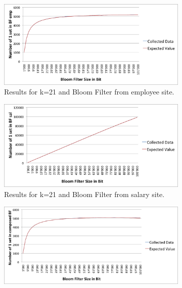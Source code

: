 \documentclass[12]{scrartcl}
\begin{document}
\begin{figure}[H]
	\begin{subfigure}[t]{\textwidth}
		\begin{center}
			\includegraphics[scale=0.3]{res/21-emp.png}
		\end{center}
		\caption{Results for k=21 and Bloom Filter from employee site.}
	\end{subfigure}
	\begin{subfigure}[t]{\textwidth}
		\begin{center}
			\includegraphics[scale=0.3]{res/21-sal.png}
		\end{center}
		\caption{Results for k=21 and Bloom Filter from salary site.}
	\end{subfigure}
	\begin{subfigure}[t]{\textwidth}
		\begin{center}
			\includegraphics[scale=0.3]{res/21-composed.png}

\end{center}
\end{subfigure}
\end{figure}
\end{document}

